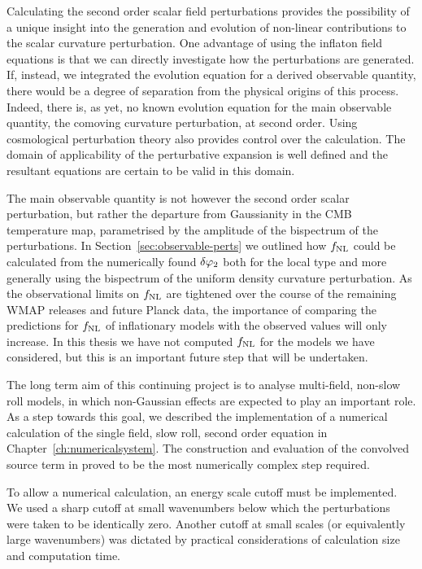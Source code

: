 Calculating the second order scalar field perturbations provides the possibility of
a unique insight into the generation and evolution of non-linear contributions to
the scalar curvature perturbation. 
% 
One advantage of using the inflaton field equations is that we can directly
investigate how the perturbations are generated.
If, instead, we integrated the evolution
equation for a derived observable quantity, there would be a degree of
separation from the physical origins of this process. Indeed, there is, as
yet,
no known evolution equation for the main observable quantity, the comoving
curvature perturbation, at second order. 
% 
Using cosmological perturbation theory also provides control over the calculation.
The domain of applicability of the perturbative expansion is well defined and the
resultant equations are certain to be valid in this domain.

% 
The main observable quantity is not however the second order scalar perturbation, but rather the
departure from Gaussianity in the CMB temperature map, parametrised by the amplitude of the
bispectrum of the perturbations. In Section~\ref{sec:observable-perts} we outlined how $f_{\mathrm{NL}}$ could
be calculated from the numerically found $\delta\varphi_{2}$ both for the local type and more generally using
the bispectrum of the uniform density curvature perturbation. As the observational limits on $f_{\mathrm{NL}}$
are tightened over the course of the remaining WMAP releases and future Planck data, the importance
of comparing the predictions for $f_{\mathrm{NL}}$ of inflationary models with the observed values will only
increase. In this thesis we have not computed $f_{\mathrm{NL}}$ for the models we have considered, but this is
an important future step that will be undertaken. 


The long term aim of this continuing project is
to analyse multi-field, non-slow roll models, in which non-Gaussian effects are
expected to play an important role.
% 
As a step towards this goal, we described the implementation of a numerical
calculation of the single field, slow roll, second order equation in
Chapter~\ref{ch:numericalsystem}. The construction and evaluation of the convolved
source term in  proved to be the most numerically complex
step required. 

To allow a numerical calculation, an energy scale cutoff must be implemented. We used
a sharp cutoff at small wavenumbers below which the perturbations were taken to be
identically zero. Another cutoff at small scales (or equivalently large wavenumbers) was dictated
by practical considerations of calculation size and computation time. 

